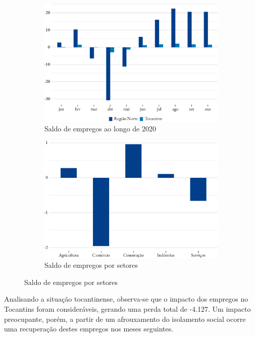 \begin{figure}[!h]
	\begin{subfigure}{\linewidth}
		\caption{Saldo de empregos ao longo de 2020}
		\label{fig:sel2020}
		\includegraphics{fig/saldo-1.pdf}
	\end{subfigure}
	\begin{subfigure}{\linewidth}
		\caption{Saldo de empregos por setores}
		\label{fig:setores}
		\includegraphics{fig/saldo_setor_to-1.pdf}
	\end{subfigure}
\end{figure}

\par Analisando a situação tocantinense, observa-se que o impacto dos
empregos no Tocantins foram consideráveis, gerando uma perda total de -4.127. Um impacto preocupante, porém, a partir de um afrouxamento do isolamento social ocorre uma recuperação destes empregos nos meses seguintes.

